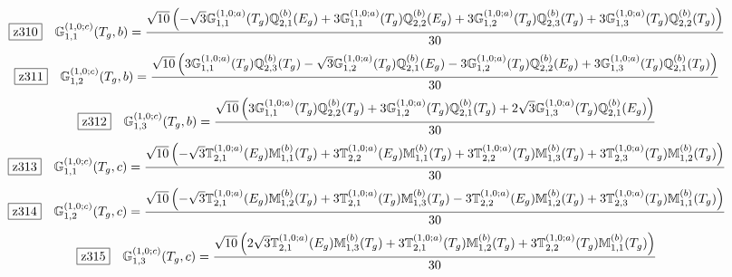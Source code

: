 \documentclass[fleqn,10pt,landscape]{jsarticle}
\begin{document}
\begin{dmath*}
\hspace*{3mm}\fbox{z310}\quad \mathbb{G}_{1,1}^{(1,0;c)}(T_{g},b)=\frac{\sqrt{10} \left(- \sqrt{3} \mathbb{G}_{1,1}^{(1,0;a)}(T_{g}) \mathbb{Q}_{2,1}^{(b)}(E_{g}) + 3 \mathbb{G}_{1,1}^{(1,0;a)}(T_{g}) \mathbb{Q}_{2,2}^{(b)}(E_{g}) + 3 \mathbb{G}_{1,2}^{(1,0;a)}(T_{g}) \mathbb{Q}_{2,3}^{(b)}(T_{g}) + 3 \mathbb{G}_{1,3}^{(1,0;a)}(T_{g}) \mathbb{Q}_{2,2}^{(b)}(T_{g})\right)}{30}
\end{dmath*}
\begin{dmath*}
\hspace*{3mm}\fbox{z311}\quad \mathbb{G}_{1,2}^{(1,0;c)}(T_{g},b)=\frac{\sqrt{10} \left(3 \mathbb{G}_{1,1}^{(1,0;a)}(T_{g}) \mathbb{Q}_{2,3}^{(b)}(T_{g}) - \sqrt{3} \mathbb{G}_{1,2}^{(1,0;a)}(T_{g}) \mathbb{Q}_{2,1}^{(b)}(E_{g}) - 3 \mathbb{G}_{1,2}^{(1,0;a)}(T_{g}) \mathbb{Q}_{2,2}^{(b)}(E_{g}) + 3 \mathbb{G}_{1,3}^{(1,0;a)}(T_{g}) \mathbb{Q}_{2,1}^{(b)}(T_{g})\right)}{30}
\end{dmath*}
\begin{dmath*}
\hspace*{3mm}\fbox{z312}\quad \mathbb{G}_{1,3}^{(1,0;c)}(T_{g},b)=\frac{\sqrt{10} \left(3 \mathbb{G}_{1,1}^{(1,0;a)}(T_{g}) \mathbb{Q}_{2,2}^{(b)}(T_{g}) + 3 \mathbb{G}_{1,2}^{(1,0;a)}(T_{g}) \mathbb{Q}_{2,1}^{(b)}(T_{g}) + 2 \sqrt{3} \mathbb{G}_{1,3}^{(1,0;a)}(T_{g}) \mathbb{Q}_{2,1}^{(b)}(E_{g})\right)}{30}
\end{dmath*}
\begin{dmath*}
\hspace*{3mm}\fbox{z313}\quad \mathbb{G}_{1,1}^{(1,0;c)}(T_{g},c)=\frac{\sqrt{10} \left(- \sqrt{3} \mathbb{T}_{2,1}^{(1,0;a)}(E_{g}) \mathbb{M}_{1,1}^{(b)}(T_{g}) + 3 \mathbb{T}_{2,2}^{(1,0;a)}(E_{g}) \mathbb{M}_{1,1}^{(b)}(T_{g}) + 3 \mathbb{T}_{2,2}^{(1,0;a)}(T_{g}) \mathbb{M}_{1,3}^{(b)}(T_{g}) + 3 \mathbb{T}_{2,3}^{(1,0;a)}(T_{g}) \mathbb{M}_{1,2}^{(b)}(T_{g})\right)}{30}
\end{dmath*}
\begin{dmath*}
\hspace*{3mm}\fbox{z314}\quad \mathbb{G}_{1,2}^{(1,0;c)}(T_{g},c)=\frac{\sqrt{10} \left(- \sqrt{3} \mathbb{T}_{2,1}^{(1,0;a)}(E_{g}) \mathbb{M}_{1,2}^{(b)}(T_{g}) + 3 \mathbb{T}_{2,1}^{(1,0;a)}(T_{g}) \mathbb{M}_{1,3}^{(b)}(T_{g}) - 3 \mathbb{T}_{2,2}^{(1,0;a)}(E_{g}) \mathbb{M}_{1,2}^{(b)}(T_{g}) + 3 \mathbb{T}_{2,3}^{(1,0;a)}(T_{g}) \mathbb{M}_{1,1}^{(b)}(T_{g})\right)}{30}
\end{dmath*}
\begin{dmath*}
\hspace*{3mm}\fbox{z315}\quad \mathbb{G}_{1,3}^{(1,0;c)}(T_{g},c)=\frac{\sqrt{10} \left(2 \sqrt{3} \mathbb{T}_{2,1}^{(1,0;a)}(E_{g}) \mathbb{M}_{1,3}^{(b)}(T_{g}) + 3 \mathbb{T}_{2,1}^{(1,0;a)}(T_{g}) \mathbb{M}_{1,2}^{(b)}(T_{g}) + 3 \mathbb{T}_{2,2}^{(1,0;a)}(T_{g}) \mathbb{M}_{1,1}^{(b)}(T_{g})\right)}{30}
\end{dmath*}
\end{document}
